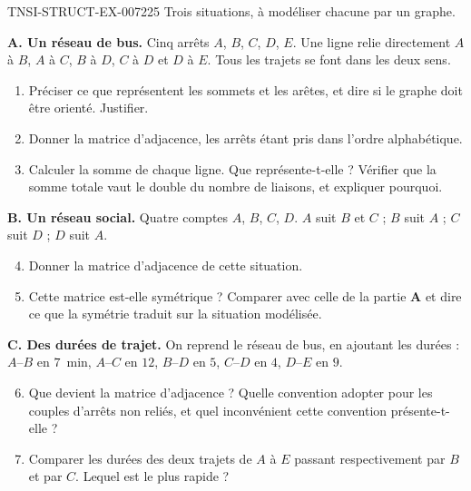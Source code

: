 \begin{exercice}{TNSI-STRUCT-EX-007}{2}{25}
Trois situations, à modéliser chacune par un graphe.

\medskip
\textbf{A. Un réseau de bus.} Cinq arrêts $A$, $B$, $C$, $D$, $E$. Une ligne
relie directement $A$ à $B$, $A$ à $C$, $B$ à $D$, $C$ à $D$ et $D$ à $E$. Tous
les trajets se font dans les deux sens.
\begin{enumerate}
  \item Préciser ce que représentent les sommets et les arêtes, et dire si le
    graphe doit être orienté. Justifier.
  \item Donner la matrice d'adjacence, les arrêts étant pris dans l'ordre
    alphabétique.
  \item Calculer la somme de chaque ligne. Que représente-t-elle ? Vérifier que
    la somme totale vaut le double du nombre de liaisons, et expliquer pourquoi.
\end{enumerate}

\medskip
\textbf{B. Un réseau social.} Quatre comptes $A$, $B$, $C$, $D$. $A$ suit $B$ et
$C$ ; $B$ suit $A$ ; $C$ suit $D$ ; $D$ suit $A$.
\begin{enumerate}
  \setcounter{enumi}{3}
  \item Donner la matrice d'adjacence de cette situation.
  \item Cette matrice est-elle symétrique ? Comparer avec celle de la partie
    \textbf{A} et dire ce que la symétrie traduit sur la situation modélisée.
\end{enumerate}

\medskip
\textbf{C. Des durées de trajet.} On reprend le réseau de bus, en ajoutant les
durées : $A$–$B$ en $7$~min, $A$–$C$ en $12$, $B$–$D$ en $5$, $C$–$D$ en $4$,
$D$–$E$ en $9$.
\begin{enumerate}
  \setcounter{enumi}{5}
  \item Que devient la matrice d'adjacence ? Quelle convention adopter pour les
    couples d'arrêts non reliés, et quel inconvénient cette convention
    présente-t-elle ?
  \item Comparer les durées des deux trajets de $A$ à $E$ passant respectivement
    par $B$ et par $C$. Lequel est le plus rapide ?
\end{enumerate}
\end{exercice}
